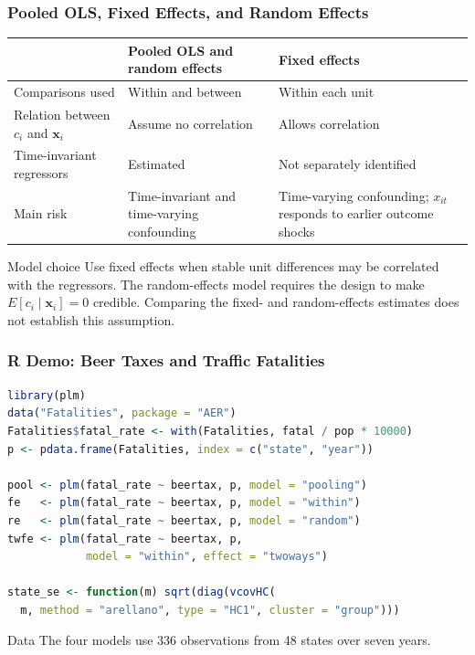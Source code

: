 \documentclass[xcolor=svgnames,9pt,english, aspectratio=169]{beamer}
\newcommand{\mb}{\mathbf}
\newcommand{\x}{\ensuremath{\mb{x}}}
\begin{document}
\begin{frame}
  \frametitle{Pooled OLS, Fixed Effects, and Random Effects}
\small
\begin{center}
\renewcommand{\arraystretch}{1.35}
\begin{tabular}{>{\raggedright\arraybackslash}p{}>{\raggedright\arraybackslash}p{}>{\raggedright\arraybackslash}p{}}
 & \textbf{Pooled OLS and random effects} & \textbf{Fixed effects} \\ \hline
Comparisons used & Within and between & Within each unit \\
Relation between $c_i$ and $\x_i$ & Assume no correlation & Allows correlation \\
Time-invariant regressors & Estimated & Not separately identified \\
Main risk & Time-invariant and time-varying confounding & Time-varying confounding; $x_{it}$ responds to earlier outcome shocks \\
\end{tabular}
\end{center}
\bigskip\pause
\begin{block}{Model choice}
Use fixed effects when stable unit differences may be correlated with the regressors. The random-effects model requires the design to make $E[c_i\mid\x_i]=0$ credible. Comparing the fixed- and random-effects estimates does not establish this assumption.
\end{block}
\end{frame}

\begin{frame}[fragile]
  \frametitle{R Demo: Beer Taxes and Traffic Fatalities}
\begin{lstlisting}[language=R,basicstyle=\ttfamily\footnotesize]
library(plm)
data("Fatalities", package = "AER")
Fatalities$fatal_rate <- with(Fatalities, fatal / pop * 10000)
p <- pdata.frame(Fatalities, index = c("state", "year"))

pool <- plm(fatal_rate ~ beertax, p, model = "pooling")
fe   <- plm(fatal_rate ~ beertax, p, model = "within")
re   <- plm(fatal_rate ~ beertax, p, model = "random")
twfe <- plm(fatal_rate ~ beertax, p,
            model = "within", effect = "twoways")

state_se <- function(m) sqrt(diag(vcovHC(
  m, method = "arellano", type = "HC1", cluster = "group")))
\end{lstlisting}
\begin{block}{Data}
The four models use 336 observations from 48 states over seven years.
\end{block}
\end{frame}
\end{document}
